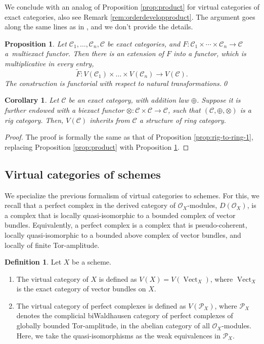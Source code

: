 \documentclass[JEP,XML,SOM,Unicode,published]{cedram}
\theoremstyle{plain}
\newtheorem{proposition}[theorem]{Proposition}
\newtheorem{corollary}[theorem]{Corollary}
\theoremstyle{definition}
\newtheorem{definition}[theorem]{Definition}
\newcommand{\Ccal}{\mathcal C}
\newcommand{\Ocal}{\mathcal O}
\newcommand{\Pcal}{\mathcal P}
\DeclareMathOperator{\Vect}{Vect}
\begin{document}
We conclude with an analog of Proposition \ref{prop:product} for virtual categories of exact categories, also see Remark \ref{rem:orderdevelopproduct}. The argument goes along the same lines as in \loccit, and we don't provide the details.
\begin{proposition}\label{prop:product-virtual}
Let $\Ccal_{1},\ldots,\Ccal_{n},\Ccal$ be exact categories, and \hbox{$F\colon \Ccal_{1}\!\times\!\cdots\!\times\!\Ccal_{n}\!\to\!\Ccal$} a~multiexact functor. Then there is an extension of $F$ into a functor, which is multiplicative in every entry,
\begin{displaymath}
\widetilde{F}\colon V(\Ccal_{1})\times\ldots \times V(\Ccal_{n})\to V(\Ccal).
\end{displaymath}
The construction is functorial with respect to natural transformations.\qed
\end{proposition}

\begin{corollary}\label{cor:product-virtual}
Let $\Ccal$ be an exact category, with addition law $\oplus$. Suppose it is further endowed with a biexact functor $\otimes\colon\Ccal\times\Ccal\to\Ccal$, such that $(\Ccal,\oplus,\otimes)$ is a rig category. Then, $V(\Ccal)$ inherits from $\Ccal$ a structure of ring category.
\end{corollary}
\begin{proof}
The proof is formally the same as that of Proposition \ref{prop:rig-to-ring-1}, replacing Proposition \ref{prop:product} with Proposition \ref{prop:product-virtual}.
\end{proof}

\subsection{Virtual categories of schemes}\label{sec:virtual-schemes}
We specialize the previous formalism of virtual categories to schemes. For this, we recall that a perfect complex in the derived category of $\Ocal_X$-modules, $D(\Ocal_X)$, is a complex that is locally quasi-isomorphic to a bounded complex of vector bundles. Equivalently, a perfect complex is a complex that is pseudo-coherent, \ie locally quasi-isomorphic to a bounded above complex of vector bundles, and locally of finite Tor-amplitude.

\begin{definition}\label{def:virtual-category-perfect}
Let $X$ be a scheme.
\begin{enumerate}
\item The virtual category of $X$ is defined as $V(X) = V(\Vect_X)$, where $\Vect_{X}$ is the exact category of vector bundles on $X$.

\item The virtual category of perfect complexes is defined as $V(\Pcal_X)$, where $\Pcal_X$ denotes the complicial biWaldhausen category of perfect complexes of globally bounded Tor-amplitude, in the abelian category of all $\Ocal_X$-modules. Here, we take the quasi-isomorphisms as the weak equivalences in $\Pcal_{X}$.
\end{enumerate}
\end{definition}
\end{document}

